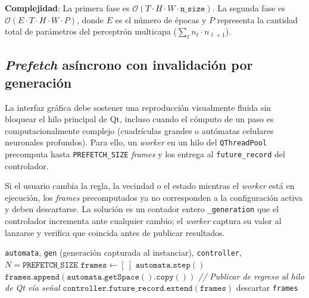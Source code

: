 \textbf{Complejidad}: La primera fase es $\mathcal{O}(T \cdot H \cdot W \cdot \texttt{n\_size})$. La segunda fase es $\mathcal{O}(E \cdot T \cdot H \cdot W \cdot P)$, donde $E$ es el número de épocas y $P$ representa la cantidad total de parámetros del perceptrón multicapa ($\sum_\ell n_\ell \cdot n_{\ell+1}$).

\subsection{\textit{Prefetch} asíncrono con invalidación por generación}

La interfaz gráfica debe sostener una reproducción visualmente fluida sin bloquear el hilo principal de Qt, incluso cuando el cómputo de un paso es computacionalmente complejo (cuadrículas grandes o autómatas celulares neuronales profundos). Para ello, un \textit{worker} en un hilo del \texttt{QThreadPool} precomputa hasta \texttt{PREFETCH\_SIZE} \textit{frames} y los entrega al \texttt{future\_record} del controlador.

Si el usuario cambia la regla, la vecindad o el estado mientras el \textit{worker} está en ejecución, los \textit{frames} precomputados ya no corresponden a la configuración activa y deben descartarse. La solución es un contador entero \texttt{\_generation} que el controlador incrementa ante cualquier cambio; el \textit{worker} captura su valor al lanzarse y verifica que coincida antes de publicar resultados.

\begin{breakablealgorithm}
\caption{PrefetchWorker.run: producción asíncrona de \textit{frames}}
\label{alg:prefetch}
\begin{algorithmic}[1]
\Require \texttt{automata}, \texttt{gen} (generación capturada al instanciar), \texttt{controller}, $N = \texttt{PREFETCH\_SIZE}$
\State $\texttt{frames} \gets [\ ]$
        \State \Return {}
    \EndIf
    \State $\texttt{automata.step}()$
    \State $\texttt{frames.append}(\texttt{automata.getSpace}().\texttt{copy}())$
\EndFor
\Statex
\State \textit{// Publicar de regreso al hilo de Qt vía señal}
    \State $\texttt{controller.future\_record.extend}(\texttt{frames})$
\Else
    \State descartar \texttt{frames}
\EndIf
\end{algorithmic}
\end{breakablealgorithm}

